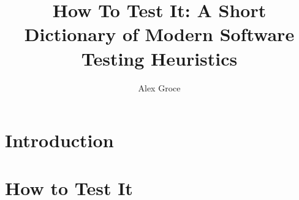 \documentclass{book}
\title{How To Test It: A Short Dictionary of Modern Software Testing Heuristics}
\author{Alex Groce}
\begin{document}
\frontmatter

\maketitle





\mainmatter

\part{Introduction}



\part{How to Test It}





\backmatter



\end{document}
